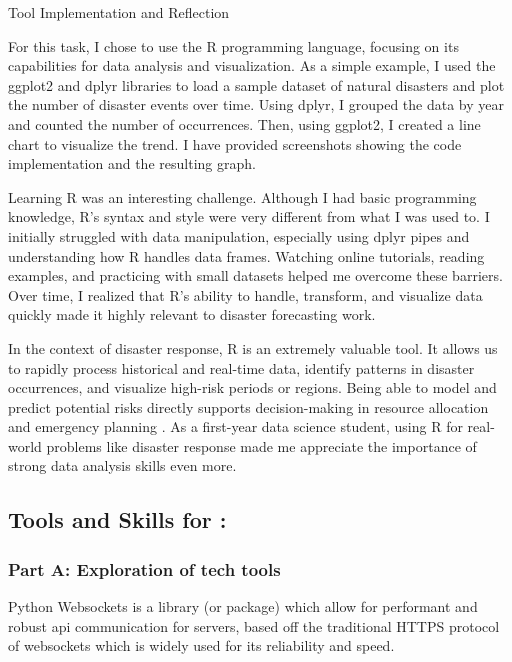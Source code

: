 \documentclass[a4paper, 11pt]{report}
\begin{document}
Tool Implementation and Reflection

For this task, I chose to use the R programming language, focusing on its capabilities for data analysis and visualization. As a simple example, I used the ggplot2 and dplyr libraries to load a sample dataset of natural disasters and plot the number of disaster events over time. Using dplyr, I grouped the data by year and counted the number of occurrences. Then, using ggplot2, I created a line chart to visualize the trend. I have provided screenshots showing the code implementation and the resulting graph.

Learning R was an interesting challenge. Although I had basic programming knowledge, R’s syntax and style were very different from what I was used to. I initially struggled with data manipulation, especially using dplyr pipes and understanding how R handles data frames. Watching online tutorials, reading examples, and practicing with small datasets helped me overcome these barriers. Over time, I realized that R’s ability to handle, transform, and visualize data quickly made it highly relevant to disaster forecasting work.

In the context of disaster response, R is an extremely valuable tool. It allows us to rapidly process historical and real-time data, identify patterns in disaster occurrences, and visualize high-risk periods or regions. Being able to model and predict potential risks directly supports decision-making in resource allocation and emergency planning \cite{viswanathan2016}. As a first-year data science student, using R for real-world problems like disaster response made me appreciate the importance of strong data analysis skills even more.




\subsection{Tools and Skills for \majC: \studC}

\subsubsection{Part A: Exploration of tech tools}

Python Websockets is a library (or package) which allow for performant and robust api communication for servers, based off the traditional HTTPS protocol of websockets which is widely used for its reliability and speed. 
\end{document}
